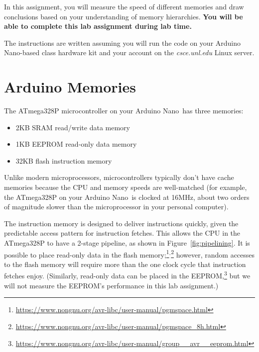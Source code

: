 


\usepackage{graphicx}

\renewcommand{\labnumber}{10}
\renewcommand{\labname}{Memory Measurement Lab}
\renewcommand{\shortlabname}{memorylab}
\renewcommand{\collaborationrules}{This is an individual-effort project. You
may discuss the nature of memory technologies and of memory hierarchies with
classmates, but you must draw your own conclusions.}
\renewcommand{\duedate}{Week of December 6, at the end of your lab section}
\newcommand{\nano}{Arduino Nano}
\renewcommand{\runtimeenvironment}{your \nano-based class hardware kit and your
account on the \textit{csce.unl.edu} Linux server}
\startdocument


In this assignment, you will measure the speed of different memories and draw
conclusions based on your understanding of memory hierarchies. \textbf{You will
be able to complete this lab assignment during lab time.}

The instructions are written assuming you will run the code on
\runtimeenvironment.

\section{Arduino Memories}

The ATmega328P microcontroller on your \nano\ has three memories:
\begin{itemize}
\item 2KB SRAM read/write data memory
\item 1KB EEPROM read-only data memory
\item 32KB flash instruction memory
\end{itemize}

Unlike modern microprocessors, microcontrollers typically don't have cache
memories because the CPU and memory speeds are well-matched (for example,
the ATmega328P on your \nano\ is clocked at 16MHz, about two orders of
magnitude slower than the microprocessor in your personal computer).

The instruction memory is designed to deliver instructions quickly, given the
predictable access pattern for instruction fetches. This allows the CPU in the
ATmega328P to have a 2-stage pipeline, as shown in Figure~\ref{fig:pipelining}.
It is possible to place read-only data in the flash
memory;\footnote{\url{https://www.nongnu.org/avr-libc/user-manual/pgmspace.html}}$^,$\footnote{\url{https://www.nongnu.org/avr-libc/user-manual/pgmspace_8h.html}}
however, random accesses to the flash memory will require more than the one
clock cycle that instruction fetches enjoy. (Similarly, read-only data can be
placed in the EEPROM,\footnote{\url{https://www.nongnu.org/avr-libc/user-manual/group__avr__eeprom.html}}
but we will not measure the EEPROM's performance in this lab assignment.)

